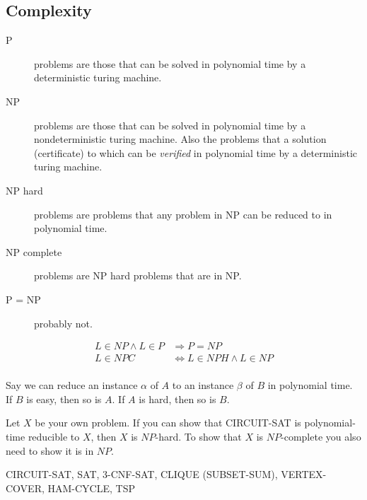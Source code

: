 \documentclass[landscape]{cheat}
\begin{document}
\begin{multicols*}{3}
\section{Complexity}
\begin{description}
    \item[P] problems are those that can be solved in polynomial time by a deterministic turing machine.
    \item[NP] problems are those that can be solved in polynomial time by a nondeterministic turing machine.
        Also the problems that a solution (certificate) to which can be \emph{verified} in polynomial time by a deterministic turing machine.
    \item[NP hard] problems are problems that any problem in NP can be reduced to in polynomial time.
    \item[NP complete] problems are NP hard problems that are in NP.
    \item[P = NP] probably not.
\end{description}

\begin{align*}
L \in NP \wedge L \in P &\Rightarrow P = NP\\
L \in NPC &\Leftrightarrow L \in NPH \wedge L \in NP\\
\end{align*}

Say we can reduce an instance $\alpha$ of $A$ to an instance $\beta$ of $B$ in polynomial time. If $B$ is easy, then so is $A$. If $A$ is hard, then so is $B$.

Let $X$ be your own problem. If you can show that CIRCUIT-SAT is polynomial-time reducible to $X$, then $X$ is $NP$-hard. To show that $X$ is $NP$-complete you also need to show it is in $NP$.


CIRCUIT-SAT, SAT, 3-CNF-SAT, CLIQUE (SUBSET-SUM), VERTEX-COVER, HAM-CYCLE, TSP


\end{multicols*}
\end{document}
